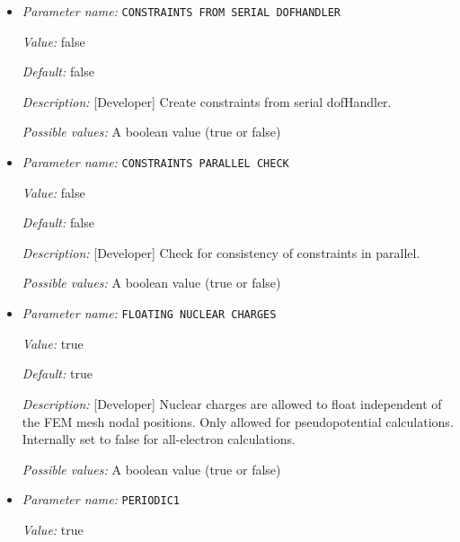 \begin{itemize}
\item {\it Parameter name:} {\tt CONSTRAINTS FROM SERIAL DOFHANDLER}
\label{parameters:Boundary conditions/CONSTRAINTS FROM SERIAL DOFHANDLER}
\label{parameters:Boundary_20conditions/CONSTRAINTS_20FROM_20SERIAL_20DOFHANDLER}


{\it Value:} false


{\it Default:} false


{\it Description:} [Developer] Create constraints from serial dofHandler.


{\it Possible values:} A boolean value (true or false)
\item {\it Parameter name:} {\tt CONSTRAINTS PARALLEL CHECK}
\label{parameters:Boundary conditions/CONSTRAINTS PARALLEL CHECK}
\label{parameters:Boundary_20conditions/CONSTRAINTS_20PARALLEL_20CHECK}


{\it Value:} false


{\it Default:} false


{\it Description:} [Developer] Check for consistency of constraints in parallel.


{\it Possible values:} A boolean value (true or false)
\item {\it Parameter name:} {\tt FLOATING NUCLEAR CHARGES}
\label{parameters:Boundary conditions/FLOATING NUCLEAR CHARGES}
\label{parameters:Boundary_20conditions/FLOATING_20NUCLEAR_20CHARGES}


{\it Value:} true


{\it Default:} true


{\it Description:} [Developer] Nuclear charges are allowed to float independent of the FEM mesh nodal positions. Only allowed for pseudopotential calculations. Internally set to false for all-electron calculations.


{\it Possible values:} A boolean value (true or false)
\item {\it Parameter name:} {\tt PERIODIC1}
\label{parameters:Boundary conditions/PERIODIC1}
\label{parameters:Boundary_20conditions/PERIODIC1}


{\it Value:} true



\end{itemize}
